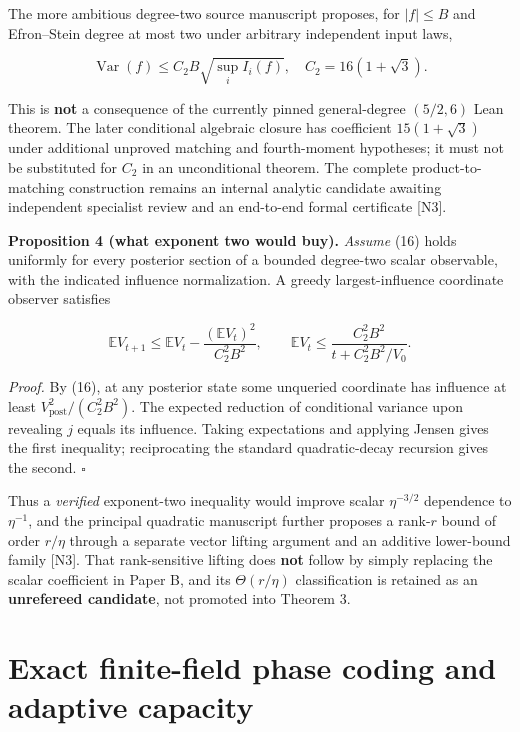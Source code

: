 \documentclass[
  10pt,
]{article}
\begin{document}
The more ambitious degree-two source manuscript proposes, for
\(|f|\le B\) and Efron--Stein degree at most two under arbitrary
independent input laws,

\[
\boxed{\operatorname{Var}(f)\le C_2B\sqrt{\sup_i I_i(f)},
\quad C_2=16(1+\sqrt3).} \tag{16}
\]

This is \textbf{not} a consequence of the currently pinned
general-degree \((5/2,6)\) Lean theorem. The later conditional algebraic
closure has coefficient \(15(1+\sqrt3)\) under additional unproved
matching and fourth-moment hypotheses; it must not be substituted for
\(C_2\) in an unconditional theorem. The complete product-to-matching
construction remains an internal analytic candidate awaiting independent
specialist review and an end-to-end formal certificate {[}N3{]}.

\textbf{Proposition 4 (what exponent two would buy).} \emph{Assume} (16)
holds uniformly for every posterior section of a bounded degree-two
scalar observable, with the indicated influence normalization. A greedy
largest-influence coordinate observer satisfies

\[
\mathbb E V_{t+1}\le\mathbb EV_t
-\frac{(\mathbb EV_t)^2}{C_2^2B^2},
\qquad
\boxed{\mathbb EV_t\le\frac{C_2^2B^2}{t+C_2^2B^2/V_0}}. \tag{17}
\]

\emph{Proof.} By (16), at any posterior state some unqueried coordinate
has influence at least \(V_{\mathrm{post}}^2/(C_2^2B^2)\). The expected
reduction of conditional variance upon revealing \(j\) equals its
influence. Taking expectations and applying Jensen gives the first
inequality; reciprocating the standard quadratic-decay recursion gives
the second. \(\square\)

Thus a \emph{verified} exponent-two inequality would improve scalar
\(\eta^{-3/2}\) dependence to \(\eta^{-1}\), and the principal quadratic
manuscript further proposes a rank-\(r\) bound of order \(r/\eta\)
through a separate vector lifting argument and an additive lower-bound
family {[}N3{]}. That rank-sensitive lifting does \textbf{not} follow by
simply replacing the scalar coefficient in Paper B, and its
\(\Theta(r/\eta)\) classification is retained as an \textbf{unrefereed
candidate}, not promoted into Theorem 3.

\section{Exact finite-field phase coding and adaptive
capacity}\label{exact-finite-field-phase-coding-and-adaptive-capacity}
\end{document}
